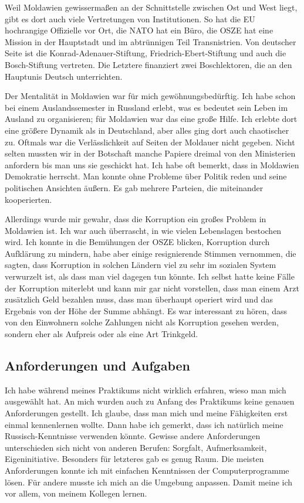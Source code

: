 \documentclass{../../sem_paper}
\begin{document}
Weil Moldawien gewissermaßen an der Schnittstelle zwischen Ost und West liegt, gibt es dort auch viele Vertretungen von Institutionen. So hat die EU hochrangige Offizielle vor Ort, die NATO hat ein Büro, die OSZE hat eine Mission in der Hauptstadt und im abtrünnigen Teil Transnistrien. Von deutscher Seite ist die Konrad-Adenauer-Stiftung, Friedrich-Ebert-Stiftung und auch die Bosch-Stiftung vertreten. Die Letztere finanziert zwei Boschlektoren, die an den Hauptunis Deutsch unterrichten.

Der Mentalität in Moldawien war für mich gewöhnungsbedürftig. Ich habe schon bei einem Auslandssemester in Russland erlebt, was es bedeutet sein Leben im Ausland zu organisieren; für Moldawien war das eine große Hilfe. Ich erlebte dort eine größere Dynamik als in Deutschland, aber alles ging dort auch chaotischer zu. Oftmals war die Verlässlichkeit auf Seiten der Moldauer nicht gegeben. Nicht selten mussten wir in der Botschaft manche Papiere dreimal von den Ministerien anfordern bis man uns sie geschickt hat. Ich habe oft bemerkt, dass in Moldawien Demokratie herrscht. Man konnte ohne Probleme über Politik reden und seine politischen Ansichten äußern. Es gab mehrere Parteien, die miteinander kooperierten. 

Allerdings wurde mir gewahr, dass die Korruption ein großes Problem in Moldawien ist. Ich war auch überrascht, in wie vielen Lebenslagen bestochen wird. Ich konnte in die Bemühungen der OSZE blicken, Korruption durch Aufklärung zu mindern, habe aber einige resignierende Stimmen vernommen, die sagten, dass Korruption in solchen Ländern viel zu sehr im sozialen System verwurzelt ist, als dass man viel dagegen tun könnte. Ich selbst hatte keine Fälle der Korruption miterlebt und kann mir gar nicht vorstellen, dass man einem Arzt zusätzlich Geld bezahlen muss, dass man überhaupt operiert wird und das Ergebnis von der Höhe der Summe abhängt. Es war interessant zu hören, dass von den Einwohnern solche Zahlungen nicht als Korruption gesehen werden, sondern eher als Aufpreis oder als eine Art Trinkgeld.

\subsection{Anforderungen und Aufgaben}
Ich habe während meines Praktikums nicht wirklich erfahren, wieso man mich ausgewählt hat. An mich wurden auch zu Anfang des Praktikums keine genauen Anforderungen gestellt. Ich glaube, dass man mich und meine Fähigkeiten erst einmal kennenlernen wollte. Dann habe ich gemerkt, dass ich natürlich meine Russisch-Kenntnisse verwenden könnte. Gewisse andere Anforderungen unterschieden sich nicht von anderen Berufen: Sorgfalt, Aufmerksamkeit, Eigeninitiative. Besonders für letzteres gab es genug Raum. Die meisten Anforderungen konnte ich mit einfachen Kenntnissen der Computerprogramme lösen. Für andere musste ich mich an die Umgebung anpassen. Damit meine ich vor allem, von meinem Kollegen lernen.
\end{document}
